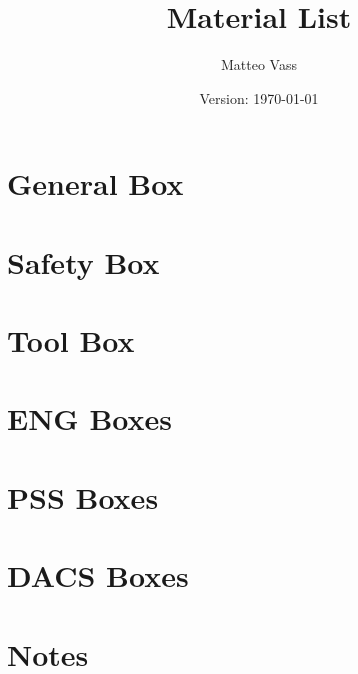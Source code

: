 \documentclass{article}
\title{Material List}
\author{Matteo Vass}
\date{Version: \isodate\today}
\begin{document}
\maketitle

\thispagestyle{fancy}

\renewcommand{\thesection}{\Alph{section}}

\section{General Box}


\section{Safety Box}


\section{Tool Box}


\section{ENG Boxes}


\section{PSS Boxes}


\section{DACS Boxes}


\newpage


\setcounter{section}{0}
\section*{Notes}

\end{document}
